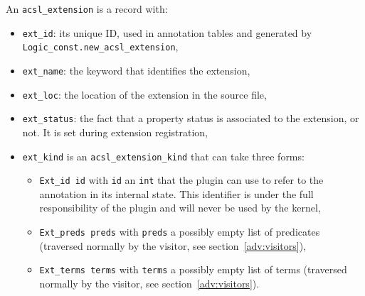 An \texttt{acsl\_extension} is a record
with:
\begin{itemize}
  \item \texttt{ext\_id}: its unique ID, used in annotation tables and generated
        by \texttt{Logic\_const.new\_acsl\_extension},
  \item \texttt{ext\_name}: the keyword that identifies the extension,
  \item \texttt{ext\_loc}: the location of the extension in the source file,
  \item \texttt{ext\_status}: the fact that a property status is associated to
        the extension, or not. It is set during extension registration,
  \item \texttt{ext\_kind} is an \texttt{acsl\_extension\_kind}
        that can take three forms:
        \begin{itemize}
          \item \texttt{Ext\_id id} with \texttt{id} an \texttt{int}
                that the plugin can use to refer to the annotation in its
                internal state. This identifier is under the full responsibility
                of the plugin and will never be used by the kernel,
          \item \texttt{Ext\_preds preds} with \texttt{preds} a possibly empty
                list of predicates (traversed normally by the visitor,
                see section~\ref{adv:visitors}),
          \item \texttt{Ext\_terms terms} with \texttt{terms} a possibly empty
                list of terms (traversed normally by the visitor,
                see section~\ref{adv:visitors}).
        \end{itemize}
\end{itemize}

